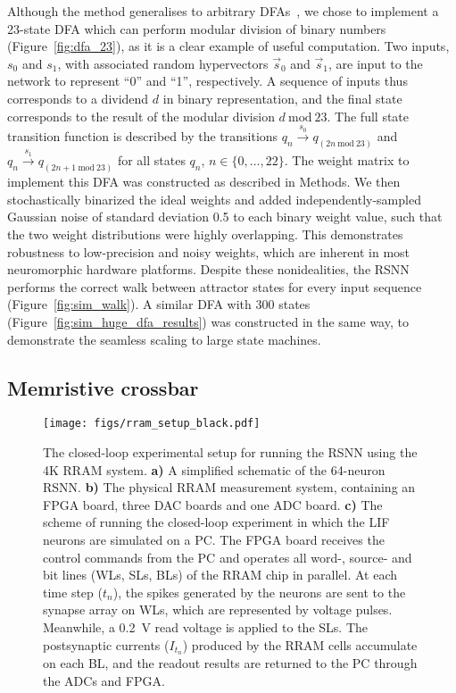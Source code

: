 Although the method generalises to arbitrary DFAs~\cite{cotteret_vector_2024}, we chose to implement a 23-state DFA which can perform modular division of binary numbers \mbox{(Figure \ref{fig:dfa_23})}, as it is a clear example of useful computation. Two inputs, $s_0$ and $s_1$, with associated random hypervectors $\vec{s}_0$ and $\vec{s}_1$, are input to the network to represent ``0'' and ``1'', respectively. A sequence of inputs thus corresponds to a dividend $d$ in binary representation, and the final state corresponds to the result of the modular division $d \ \mathrm{mod} \ 23$. The full state transition function is described by the transitions
$q_n \overset{s_0}{\longrightarrow} q_{(2n \ \mathrm{mod} \ 23)}$ and $q_n \overset{s_1}{\longrightarrow} q_{(2n +1 \ \mathrm{mod} \ 23)}$ for all states $q_n$, $n \in \{0, \ldots, 22 \}$. The weight matrix to implement this DFA was constructed as described in Methods. We then stochastically binarized the ideal weights and added independently-sampled Gaussian noise of standard deviation 0.5 to each binary weight value, such that the two weight distributions were highly overlapping. This demonstrates robustness to low-precision and noisy weights, which are inherent in most neuromorphic hardware platforms. Despite these nonidealities, the RSNN performs the correct walk between attractor states for every input sequence \mbox{(Figure \ref{fig:sim_walk})}. A similar DFA with 300 states \mbox{(Figure \ref{fig:sim_huge_dfa_results})} was constructed in the same way, to demonstrate the seamless scaling to large state machines.

\subsection{Memristive crossbar}

\begin{figure*}
    \centering
    \texttt{[image: figs/rram\_setup\_black.pdf]}
    \caption{The closed-loop experimental setup for running the RSNN using the 4K RRAM system. \textbf{a)} A simplified schematic of the 64-neuron RSNN. \textbf{b)} The physical RRAM measurement system, containing an FPGA board, three DAC boards and one ADC board. \textbf{c)} The scheme of running the closed-loop experiment in which the LIF neurons are simulated on a PC. The FPGA board receives the control commands from the PC and operates all word-, source- and bit lines (WLs, SLs, BLs) of the RRAM chip in parallel. At each time step ($t_n$), the spikes generated by the neurons are sent to the synapse array on WLs, which are represented by voltage pulses. Meanwhile, a \qty{0.2}{V} read voltage is applied to the SLs. The postsynaptic currents ($I_{t_n}$) produced by the RRAM cells accumulate on each BL, and the readout results are returned to the PC through the ADCs and FPGA.}
    \label{fig:RRAM_system}
\end{figure*}




